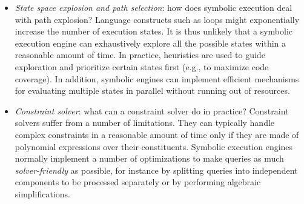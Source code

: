 \begin{itemize}[itemsep=2mm]
  \item {\em State space explosion and path selection}: how does symbolic execution deal with path explosion?
Language constructs such as loops might exponentially increase the number of execution states. It is thus unlikely that a symbolic execution engine can exhaustively explore all the possible states within a reasonable amount of time. In practice, heuristics are used to guide exploration and prioritize certain states first (e.g., to maximize code coverage). In addition, symbolic engines can implement efficient mechanisms for evaluating multiple states in parallel without running out of resources.

  \item {\em Constraint solver}: what can a constraint solver do in practice?
 Constraint solvers suffer from a number of limitations. They can typically handle complex constraints in a reasonable amount of time only if they are made of polynomial expressions over their constituents. Symbolic execution engines normally implement a number of optimizations to make queries as much {\em solver-friendly} as possible, for instance by splitting queries into independent components to be processed separately or by performing algebraic simplifications.


\end{itemize}
